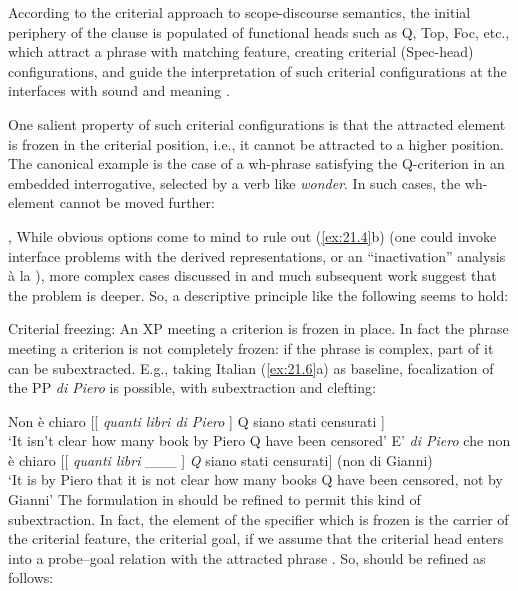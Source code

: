 \documentclass[output=paper]{langsci/langscibook}
\begin{document}
According to the criterial approach  to scope-discourse semantics, the initial
periphery of the clause is populated of functional heads such as Q, Top, Foc,
etc., which attract a phrase with matching feature, creating criterial
(Spec-head) configurations, and guide the interpretation of such criterial
configurations at the interfaces with sound and meaning \citep{Rizzi1997}.

One salient property of such criterial configurations is that the attracted
element is frozen in the criterial position, i.e., it cannot be attracted to a
higher position. The canonical example is the case of a wh-phrase satisfying
the Q-criterion in an embedded interrogative, selected by a verb like
\emph{wonder}. In such cases, the wh-element cannot be moved further:

\ea%
    \label{ex:21.4} \textcite{LasnikSaito1992}, \textcite{Boskovic2008}
    \z
\z
%
While obvious options come to mind to rule out (\ref{ex:21.4}b) (one could
invoke interface problems with the derived representations, or an
“inactivation” analysis à la \citealt{Boskovic2008}), more complex cases
discussed in \textcite{rizzicriterial,Rizzi2011} and much subsequent work suggest that the
problem is deeper. So, a descriptive principle like the following seems to
hold:

\ea%
    \label{ex:21.5}
    Criterial freezing: An XP meeting a criterion is frozen in place.
\z
%
In fact the phrase meeting a criterion is not completely frozen: if the phrase
is complex, part of it can be subextracted. E.g., taking Italian
(\ref{ex:21.6}a) as baseline, focalization of the PP \emph{di Piero} is
possible, with subextraction and clefting:\pagebreak

\ea%
    \label{ex:21.6}
    \ea Non è chiaro   [[ \emph{quanti libri di Piero} ] Q siano stati censurati ]\\
        ‘It isn’t clear       how many book by Piero Q have been censored’
    \ex E’ \emph{di Piero} che non è chiaro [[ \emph{quanti libri} \_\_\_ ] \emph{Q}  siano stati censurati] (non di Gianni)\\
        ‘It is by Piero that it is not clear how many books Q have been censored, not by Gianni’
    \z
\z
%
The formulation in  should be refined to permit this kind of
subextraction. In fact, the element of the specifier which is frozen is the
carrier of the criterial feature, the criterial goal, if we assume that the
criterial head enters into a probe--goal relation with the attracted phrase
\citep{Chomsky2000}. So,  should be refined as follows:
\end{document}
